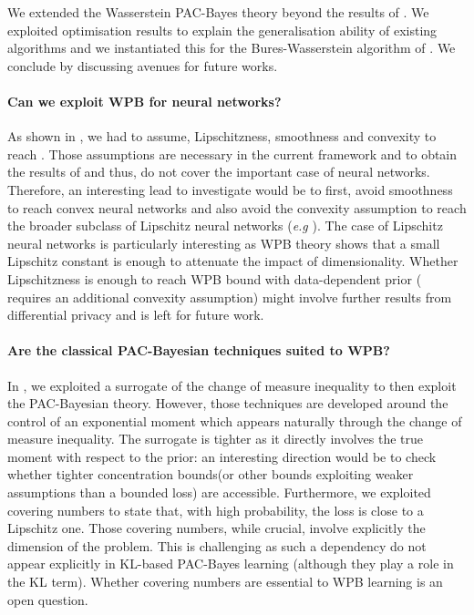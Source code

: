 We extended the Wasserstein PAC-Bayes theory beyond the results of \citet{amit2022integral}. We exploited optimisation results to explain the generalisation ability of existing algorithms and we instantiated this for the Bures-Wasserstein algorithm of \citet{lambert2022variational}. We conclude by discussing avenues for future works.

\paragraph{Can we exploit WPB for neural networks?} As shown in , we had to assume, Lipschitzness, smoothness and convexity to reach . Those assumptions are necessary in the current framework and to obtain the results of \citet{lambert2022variational} and thus, do not cover the important case of neural networks.
Therefore, an interesting lead to investigate would be to first, avoid smoothness to reach convex neural networks \citet{bengio2005convex} and also avoid the convexity assumption to reach the broader subclass of Lipschitz neural networks (\emph{e.g} \citealp{gouk2021regularisation}).
The case of Lipschitz neural networks is particularly interesting as WPB theory shows that a small Lipschitz constant is enough to attenuate the impact of dimensionality. Whether Lipschitzness is enough to reach WPB bound with data-dependent prior ( requires an additional convexity assumption) might involve further results from differential privacy and is left for future work.

\paragraph{Are the classical PAC-Bayesian techniques suited to WPB?} In , we exploited a surrogate of the change of measure inequality to then exploit the PAC-Bayesian theory. However, those techniques are developed around the control of an exponential moment which appears naturally through the change of measure inequality. The surrogate is tighter as it directly involves the true moment with respect to the prior: an interesting direction would be to check whether tighter concentration bounds(or other bounds exploiting weaker assumptions than a bounded loss) are accessible. Furthermore, we exploited covering numbers to state that, with high probability, the loss is close to a Lipschitz one. Those covering numbers, while crucial, involve explicitly the dimension of the problem. This is challenging as such a dependency do not appear explicitly in KL-based PAC-Bayes learning (although they play a role in the KL term). Whether covering numbers are essential to WPB learning is an open question.


